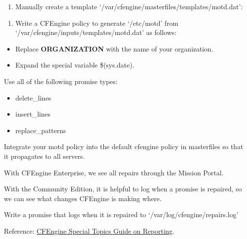 \begin{aside}
\label{aside:exercise_41}

\begin{enumerate}
\item{} Manually create a template `/var/cfengine/masterfiles/templates/motd.dat':
\end{enumerate}


\begin{enumerate}
\item{} Write a CFEngine policy to generate `/etc/motd' from `/var/cfengine/inputs/templates/motd.dat' as follows:
\end{enumerate}

\begin{itemize}
\item{} Replace \textbf{ORGANIZATION} with the name of your organization.
\item{} Expand the special variable \$(sys.date).
\end{itemize}

Use all of the following promise types:

\begin{itemize}
\item{} delete\_lines
\item{} insert\_lines
\item{} replace\_patterns
\end{itemize}

\end{aside}





\begin{aside}
\label{aside:exercise_42}

Integrate your motd policy into the default cfengine policy in masterfiles so that it propagates to all servers.

\end{aside}





\begin{aside}
\label{aside:exercise_43}

With CFEngine Enterprise, we see all repairs through the Mission Portal.

With the Community Edition, it is helpful to log when a promise is repaired, so we can see what changes CFEngine is making where.

Write a promise that logs when it is repaired to `/var/log/cfengine/repairs.log'

Reference: \href{https://auth.cfengine.com/archive/manuals/st-reporting}{CFEngine Special Topics Guide on Reporting}.

\end{aside}





